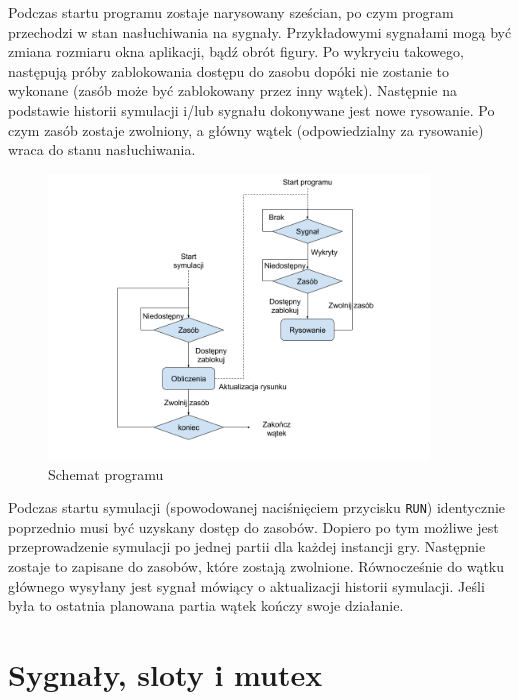 Podczas startu programu zostaje narysowany sześcian, po czym program przechodzi w stan nasłuchiwania na sygnały. Przykładowymi sygnałami mogą być zmiana rozmiaru okna aplikacji, bądź obrót figury. Po wykryciu takowego, następują próby zablokowania dostępu do zasobu dopóki nie zostanie to wykonane (zasób może być zablokowany przez inny wątek). Następnie na podstawie historii symulacji i/lub sygnału dokonywane jest nowe rysowanie. Po czym zasób zostaje zwolniony, a główny wątek (odpowiedzialny za rysowanie) wraca do stanu nasłuchiwania. 
\begin{figure}
    \centering
    \includegraphics[width=0.9\textwidth]{pict/schemat.png}   
    \caption{Schemat programu}
	\label{fig:schemat} 
\end{figure}
Podczas startu symulacji (spowodowanej naciśnięciem przycisku \texttt{RUN}) identycznie poprzednio musi być uzyskany dostęp do zasobów. Dopiero po tym możliwe jest przeprowadzenie symulacji po jednej partii dla każdej instancji gry. Następnie zostaje to zapisane do zasobów, które zostają zwolnione. Równocześnie do wątku głównego wysyłany jest sygnał mówiący o aktualizacji historii symulacji. Jeśli była to ostatnia planowana partia wątek kończy swoje działanie.

\section{Sygnały, sloty i mutex}
\label{sec::sig_slot}


